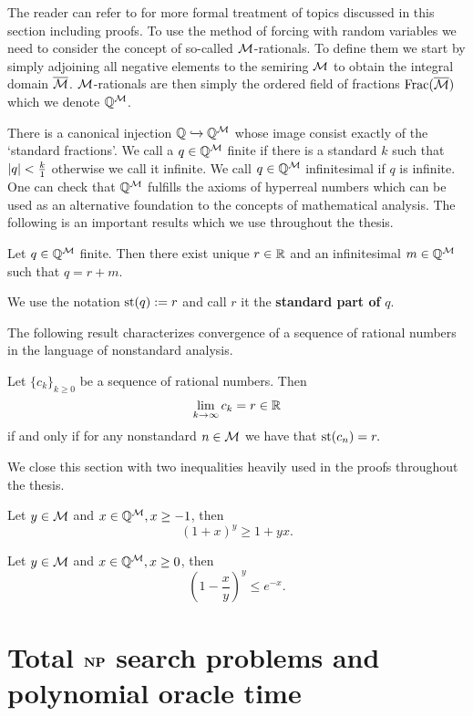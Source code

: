 The reader can refer to \cite{goldbring2014lecture} for more formal treatment of topics discussed in this section including proofs. To use the method of forcing with random variables we need to consider the concept of so-called $\mathcal{M}$-rationals. To define them we start by simply adjoining all negative elements to the semiring $\mathcal{M}$ to obtain the integral domain $\overline {\mathcal{M}}$. $\mathcal{M}$-rationals are then simply the ordered field of fractions $\text{Frac}(\overline {\mathcal{M}})$ which we denote $\mathbb{Q}^{\mathcal{M}}$.

There is a canonical injection $\mathbb{Q} \xhookrightarrow{} \mathbb{Q}^{\mathcal{M}}$ whose image consist exactly of the `standard fractions'. We call a $q\in\mathbb{Q}^{\mathcal{M}}$ finite if there is a standard $k$ such that $\left|{q}\right|<\frac{k}{1}$ otherwise we call it infinite. We call $q\in\mathbb{Q}^{\mathcal{M}}$ infinitesimal if $q$ is infinite. One can check that $\mathbb{Q}^{\mathcal{M}}$ fulfills the axioms of hyperreal numbers which can be used as an alternative foundation to the concepts of mathematical analysis. The following is an important results which we use throughout the thesis.

\begin{thrm*}
Let $q\in\mathbb{Q}^{\mathcal{M}}$ finite. Then there exist unique $r\in \mathbb{R}$ and an infinitesimal $m\in\mathbb{Q}^{\mathcal{M}}$ such that
$q=r+m.$

We use the notation $\text{st}(q):=r$ and call $r$ it the \textbf{standard part of} $q$.
\end{thrm*}

The following result characterizes convergence of a sequence of rational numbers in the language of nonstandard analysis.

\begin{thrm*}
Let $\{c_k\}_{k\geq 0}$ be a sequence of rational numbers. Then \[\lim_{k\to\infty}c_k = r \in \mathbb{R}\]
if and only if for any nonstandard $n\in \mathcal{M}$ we have that
$\text{st}(c_n)=r.$
\end{thrm*}

We close this section with two inequalities heavily used in the proofs throughout the thesis.

\begin{thrm*}
Let $y \in \mathcal{M}$ and $x\in \mathbb{Q}^{\mathcal{M}}, x\geq -1$, then
\[(1+x)^y \geq 1+yx.\]
\end{thrm*}

\begin{thrm*}
Let $y \in \mathcal{M}$ and $x\in \mathbb{Q}^{\mathcal{M}}, x\geq 0$, then
\[\left(1-\frac{x}{y}\right)^y \leq e^{-x}.\]
\end{thrm*}

\section*{Total $\textbf{NP}$ search problems and polynomial oracle time}

